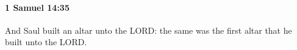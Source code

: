 
		\paragraph{1 Samuel 14:35} %
			\label{1SAMUEL-14-35}

			And Saul built an altar unto the LORD: the same was the first altar that he built unto the LORD.


